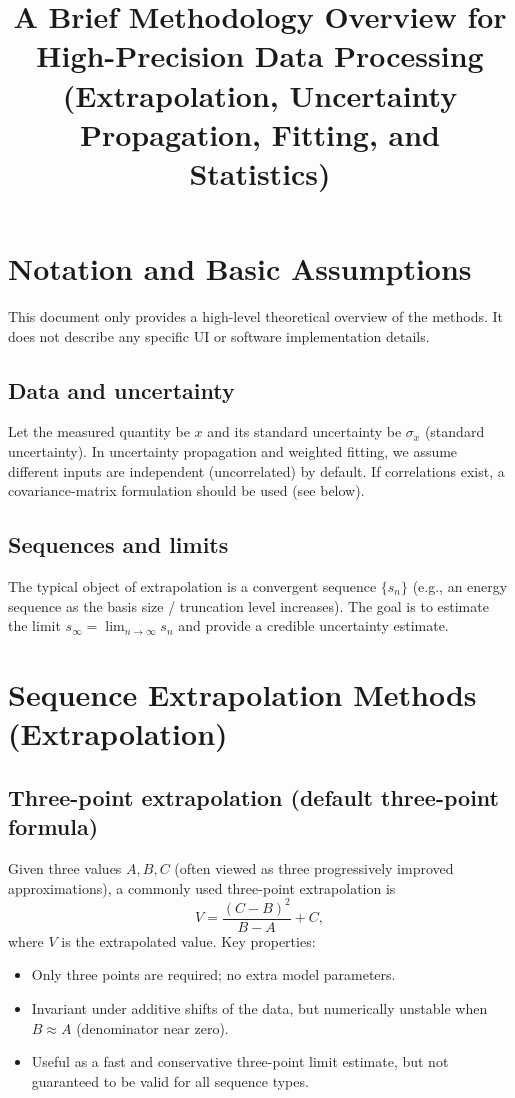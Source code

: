 \documentclass[a4paper,11pt]{article}
\title{A Brief Methodology Overview for High-Precision Data Processing\\(Extrapolation, Uncertainty Propagation, Fitting, and Statistics)}
\author{}
\date{}
\begin{document}
\maketitle

\section{Notation and Basic Assumptions}

This document only provides a high-level theoretical overview of the methods. It does not describe any specific UI or software implementation details.

\subsection{Data and uncertainty}

Let the measured quantity be $x$ and its standard uncertainty be $\sigma_x$ (standard uncertainty). In uncertainty propagation and weighted fitting, we assume different inputs are independent (uncorrelated) by default. If correlations exist, a covariance-matrix formulation should be used (see below).

\subsection{Sequences and limits}

The typical object of extrapolation is a convergent sequence $\{s_n\}$ (e.g., an energy sequence as the basis size / truncation level increases). The goal is to estimate the limit $s_\infty=\lim_{n\to\infty}s_n$ and provide a credible uncertainty estimate.

\section{Sequence Extrapolation Methods (Extrapolation)}

\subsection{Three-point extrapolation (default three-point formula)}

Given three values $A,B,C$ (often viewed as three progressively improved approximations), a commonly used three-point extrapolation is
\begin{equation}
V = \frac{(C-B)^2}{B-A} + C,
\end{equation}
where $V$ is the extrapolated value. Key properties:
\begin{itemize}
  \item Only three points are required; no extra model parameters.
  \item Invariant under additive shifts of the data, but numerically unstable when $B\approx A$ (denominator near zero).
  \item Useful as a fast and conservative three-point limit estimate, but not guaranteed to be valid for all sequence types.
\end{itemize}
\end{document}
